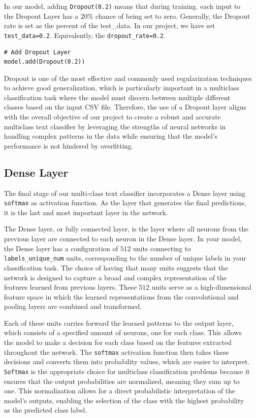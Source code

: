 In our model, adding \verb*|Dropout(0.2)| means that during training. each input to the Dropout Layer has a $20\%$ chance of being set to zero. Generally, the Dropout rate is set as the percent of the test\_data. In our project, we have set \verb*|test_data=0.2|. Equivalently, the \verb*|dropout_rate=0.2|.\\

\begin{lstlisting}
# Add Dropout Layer
model.add(Dropout(0.2))	
\end{lstlisting}

Dropout is one of the most effective and commonly used regularization techniques to achieve good generalization, which is particularly important in a multiclass classification task where the model must discern between multiple different classes based on the input CSV file.
Therefore, the use of a Dropout layer aligns with the overall objective of our project to create a robust and accurate multiclass text classifier by leveraging the strengths of neural networks in handling complex patterns in the data while ensuring that the model's performance is not hindered by overfitting.

\subsection{Dense Layer}
The final stage of our multi-class text classifier incorporates a Dense layer using \verb|softmax| as activation function. As the layer that generates the final predictions, it is the last and most important layer in the network.

The Dense layer, or fully connected layer, is the layer where all neurons from the previous layer are connected to each neuron in the Dense layer. In your model, the Dense layer has a configuration of $512$ units connecting to \verb|labels_unique_num| units, corresponding to the number of unique labels in your classification task. The choice of having that many units suggests that the network is designed to capture a broad and complex representation of the features learned from previous layers. These $512$ units serve as a high-dimensional feature space in which the learned representations from the convolutional and pooling layers are combined and transformed.

Each of these units carries forward the learned patterns to the output layer, which consists of a specified amount of neurons, one for each class. This allows the model to make a decision for each class based on the features extracted throughout the network. The \verb|softmax| activation function then takes these decisions and converts them into probability values, which are easier to interpret. \verb|Softmax| is the appropriate choice for multiclass classification problems because it ensures that the output probabilities are normalized, meaning they sum up to one. This normalization allows for a direct probabilistic interpretation of the model's outputs, enabling the selection of the class with the highest probability as the predicted class label.

